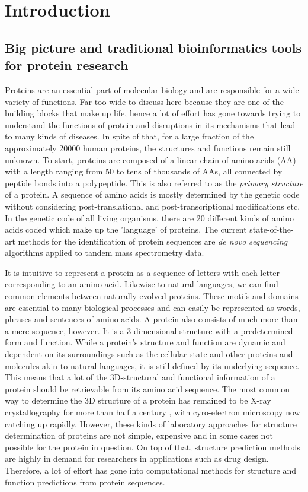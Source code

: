 \chapter[Introduction]%
{Introduction}
\section{Big picture and traditional bioinformatics tools for protein research}
Proteins are an essential part of molecular biology and are responsible for a wide variety of functions. Far too wide to discuss here because they are one of the building blocks that make up life, hence a lot of effort has gone towards trying to understand the functions of protein and disruptions in its mechanisms that lead to many kinds of diseases. In spite of that, for a large fraction of the approximately 20000 human proteins, the structures and functions remain still unknown. To start, proteins are composed of a linear chain of amino acids (AA) with a length ranging from 50 to tens of thousands of AAs, all connected by peptide bonds into a polypeptide. This is also referred to as the \textit{primary structure} of a protein.\cite{primstruct} A sequence of amino acids is mostly determined by the genetic code without considering post-translational and post-transcriptional modifications etc. In the genetic code of all living organisms, there are 20 different kinds of amino acids coded which make up the 'language' of proteins. The current state-of-the-art methods for the identification of protein sequences are \textit{de novo sequencing} algorithms applied to tandem mass spectrometry data.\cite{protseq}

It is intuitive to represent a protein as a sequence of letters with each letter corresponding to an amino acid. Likewise to natural languages, we can find common elements between naturally evolved proteins. These motifs and domains are essential to many biological processes and can easily be represented as words, phrases and sentences of amino acids. A protein also consists of much more than a mere sequence, however. It is a 3-dimensional structure with a predetermined form and function. While a protein's structure and function are dynamic and dependent on its surroundings such as the cellular state and other proteins and molecules akin to natural languages, it is still defined by its underlying sequence. This means that a lot of the 3D-structural and functional information of a protein should be retrievable from its amino acid sequence.\cite{structure} The most common way to determine the 3D structure of a protein has remained to be X-ray crystallography for more than half a century \cite{xray}, with cyro-electron microscopy now catching up rapidly.\cite{cyroem} However, these kinds of laboratory approaches for structure determination of proteins are not simple, expensive and in some cases not possible for the protein in question. On top of that, structure prediction methods are highly in demand for researchers in applications such as drug design. Therefore, a lot of effort has gone into computational methods for structure and function predictions from protein sequences.

